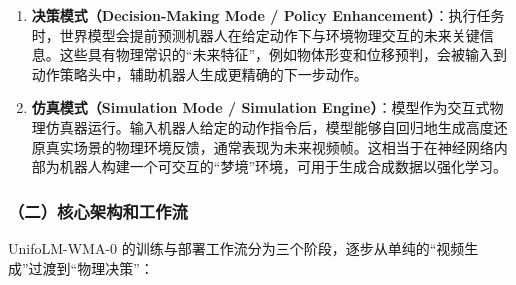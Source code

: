 \begin{enumerate}
\def\labelenumi{\arabic{enumi}.}
\tightlist
\item
  \textbf{决策模式（Decision-Making Mode / Policy Enhancement）}：执行任务时，世界模型会提前预测机器人在给定动作下与环境物理交互的未来关键信息。这些具有物理常识的``未来特征''，例如物体形变和位移预判，会被输入到动作策略头中，辅助机器人生成更精确的下一步动作。
\item
  \textbf{仿真模式（Simulation Mode / Simulation Engine）}：模型作为交互式物理仿真器运行。输入机器人给定的动作指令后，模型能够自回归地生成高度还原真实场景的物理环境反馈，通常表现为未来视频帧。这相当于在神经网络内部为机器人构建一个可交互的``梦境''环境，可用于生成合成数据以强化学习。
\end{enumerate}

\hypertarget{ux4e8cux6838ux5fc3ux67b6ux6784ux548cux5de5ux4f5cux6d41}{%
\subsubsection{（二）核心架构和工作流}\label{ux4e8cux6838ux5fc3ux67b6ux6784ux548cux5de5ux4f5cux6d41}}

UnifoLM-WMA-0 的训练与部署工作流分为三个阶段，逐步从单纯的``视频生成''过渡到``物理决策''：

